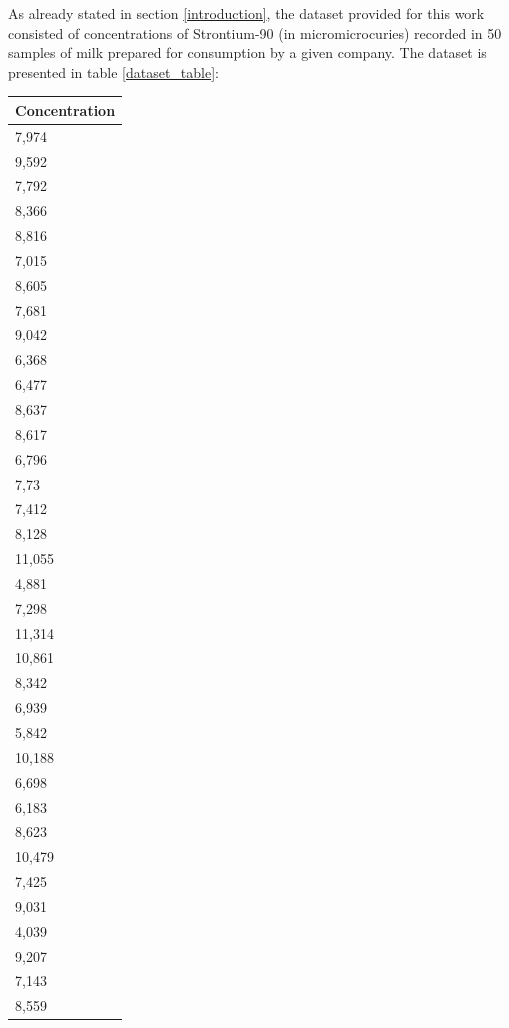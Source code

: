 \documentclass[12pt]{article}
\begin{document}
As already stated in section \ref{introduction}, the dataset provided for this work consisted of concentrations of Strontium-90 (in micromicrocuries) recorded in 50 samples of milk prepared for consumption by a given company. The dataset is presented in table \ref{dataset_table}:

\begin{longtable}{|l|}
		\hline
		Concentration \\ \hline
		7,974   \\ \hline
		9,592   \\ \hline
		7,792   \\ \hline
		8,366   \\ \hline
		8,816   \\ \hline
		7,015   \\ \hline
		8,605   \\ \hline
		7,681   \\ \hline
		9,042   \\ \hline
		6,368   \\ \hline
		6,477   \\ \hline
		8,637   \\ \hline
		8,617   \\ \hline
		6,796   \\ \hline
		7,73    \\ \hline
		7,412   \\ \hline
		8,128   \\ \hline
		11,055  \\ \hline
		4,881   \\ \hline
		7,298   \\ \hline
		11,314  \\ \hline
		10,861  \\ \hline
		8,342   \\ \hline
		6,939   \\ \hline
		5,842   \\ \hline
		10,188  \\ \hline
		6,698   \\ \hline
		6,183   \\ \hline
		8,623   \\ \hline
		10,479  \\ \hline
		7,425   \\ \hline
		9,031   \\ \hline
		4,039   \\ \hline
		9,207   \\ \hline
		7,143   \\ \hline
		8,559   \\ \hline

\end{longtable}
\end{document}
